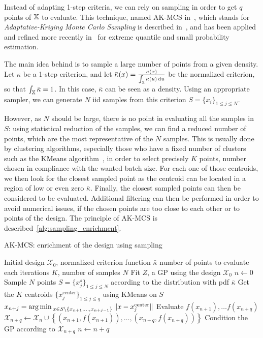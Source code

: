 \documentclass[../../Main_ManuscritThese.tex]{subfiles}
\begin{document}
Instead of adapting 1-step criteria, we can rely on sampling in order to get $q$ points of $\mathbb{X}$ to evaluate.
This technique, named AK-MCS in~\cite{echard_ak-mcs_2011}, which stands for \emph{Adaptative-Kriging Monte Carlo Sampling} is described in~\cite{dubourg_reliability-based_2011}, and has been applied and refined more recently in~\cite{schobi_rare_2017,razaaly_quantile-based_2020,razaaly_rare_2019} for extreme quantile and small probability estimation.

The main idea behind %
is to sample a large number of points from a given density.
Let $\kappa$ be a 1-step criterion, and let $\bar{\kappa}(x) = \frac{\kappa(x)}{\int_{\mathbb{X}}\kappa(u)\,\mathrm{d}u}$ be the normalized criterion, so that $\int_{\mathbb{X}} \bar{\kappa}=1$. In this case, $\bar{\kappa}$ can be seen as a density.  Using an appropriate sampler, we can generate $N$ iid samples from this criterion $S=\{x_i\}_{1\leq j \leq N}$. 
  
However, as $N$ should be large, there is no point in evaluating all the samples in $S$: using statistical reduction of the samples, we can find a reduced number of points, which are the most representative of the $N$ samples. This is usually done by clustering algorithms, especially those who have a fixed number of clusters such as the KMeans algorithm~\cite{macqueen_methods_1967}, in order to select precisely $K$ points, number chosen in compliance with the wanted batch size. For each one of those centroids, we then look for the closest sampled point as the centroid can be located in a region of low or even zero $\bar{\kappa}$.
Finally, the closest sampled points can then be considered to be evaluated.
Additional filtering can then be performed in order to avoid numerical issues, if the chosen points are too close to each other or to points of the design.
The principle of AK-MCS is described~\cref{alg:sampling_enrichment}.

\begin{algorithm}
\caption{AK-MCS: enrichment of the design using sampling}
\label{alg:sampling_enrichment}
\begin{algorithmic}
  \REQUIRE Initial design $\mathcal{X}_0$, normalized criterion function $\bar{\kappa}$
  \REQUIRE number of points to evaluate each iterations $K$, number of samples $N$
\STATE Fit $Z$, a GP using the design $\mathcal{X}_0$
\STATE $n \leftarrow 0$
\STATE Sample $N$ points $S = \{x^s_j\}_{1 \leq j \leq N}$ according to the distribution with pdf $\bar{\kappa}$
\STATE Get the $K$ centroids $\{x_j^{\mathrm{center}}\}_{1 \leq j \leq q}$ using KMeans on $S$
\STATE $x_{n+j}=\operatorname*{arg\,min \,}_{x \in S \setminus \{x_{n+1}, \dots, x_{n+j-1}\}} \|x - x_j^{\mathrm{center}} \|$
\ENDFOR
\STATE Evaluate $f(x_{n+1}),\dots f(x_{n+q})$
\STATE $\mathcal{X}_{n+q} \leftarrow \mathcal{X}_n \cup \left\{\left(x_{n+1}, f(x_{n+1})\right),\dots,  \left(x_{n+q}, f(x_{n+q})\right)\right\}$
\STATE Condition the GP according to $\mathcal{X}_{n+q}$
\STATE $n \leftarrow n + q$
\ENDWHILE
\end{algorithmic}
\end{algorithm}
\end{document}
